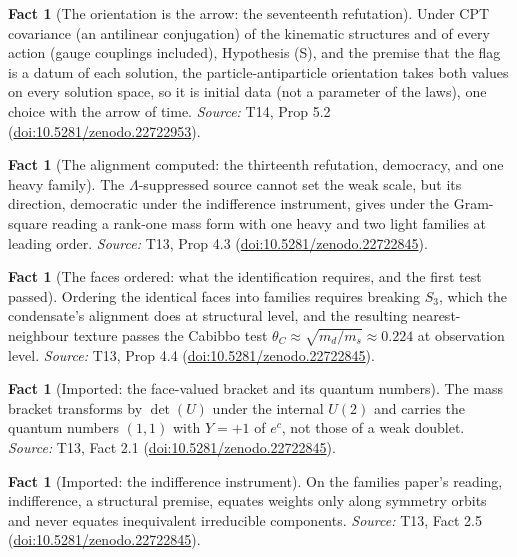 \documentclass[11pt]{article}
\theoremstyle{definition}
\newtheorem{fact}[theorem]{Fact}
\theoremstyle{plain}
\begin{document}
\begin{fact}[The orientation is the arrow: the seventeenth refutation]\label{c:dark-matter.orientation-arrow-seventeenth-refutation}
Under CPT covariance (an antilinear conjugation) of the kinematic structures and of every action (gauge couplings included), Hypothesis (S), and the premise that the flag is a datum of each solution, the particle-antiparticle orientation takes both values on every solution space, so it is initial data (not a parameter of the laws), one choice with the arrow of time.
\emph{Source:} T14, Prop 5.2 (\href{https://doi.org/10.5281/zenodo.22722953}{doi:10.5281/zenodo.22722953}).
\end{fact}

\begin{fact}[The alignment computed: the thirteenth refutation, democracy, and one heavy family]\label{c:families.alignment-computed-thirteenth-refutation-democracy-one}
The $\Lambda$-suppressed source cannot set the weak scale, but its direction, democratic under the indifference instrument, gives under the Gram-square reading a rank-one mass form with one heavy and two light families at leading order.
\emph{Source:} T13, Prop 4.3 (\href{https://doi.org/10.5281/zenodo.22722845}{doi:10.5281/zenodo.22722845}).
\end{fact}

\begin{fact}[The faces ordered: what the identification requires, and the first test passed]\label{c:families.faces-ordered-what-identification-requires-first}
Ordering the identical faces into families requires breaking $S_{3}$, which the condensate's alignment does at structural level, and the resulting nearest-neighbour texture passes the Cabibbo test $\theta_{C} \approx \sqrt{m_{d}/m_{s}} \approx 0.224$ at observation level.
\emph{Source:} T13, Prop 4.4 (\href{https://doi.org/10.5281/zenodo.22722845}{doi:10.5281/zenodo.22722845}).
\end{fact}

\begin{fact}[Imported: the face-valued bracket and its quantum numbers]\label{c:families.imported-face-valued-bracket-quantum-numbers}
The mass bracket transforms by $\det(U)$ under the internal $U(2)$ and carries the quantum numbers $(1,1)$ with $Y = +1$ of $e^{c}$, not those of a weak doublet.
\emph{Source:} T13, Fact 2.1 (\href{https://doi.org/10.5281/zenodo.22722845}{doi:10.5281/zenodo.22722845}).
\end{fact}

\begin{fact}[Imported: the indifference instrument]\label{c:families.imported-indifference-instrument}
On the families paper's reading, indifference, a structural premise, equates weights only along symmetry orbits and never equates inequivalent irreducible components.
\emph{Source:} T13, Fact 2.5 (\href{https://doi.org/10.5281/zenodo.22722845}{doi:10.5281/zenodo.22722845}).
\end{fact}
\end{document}
